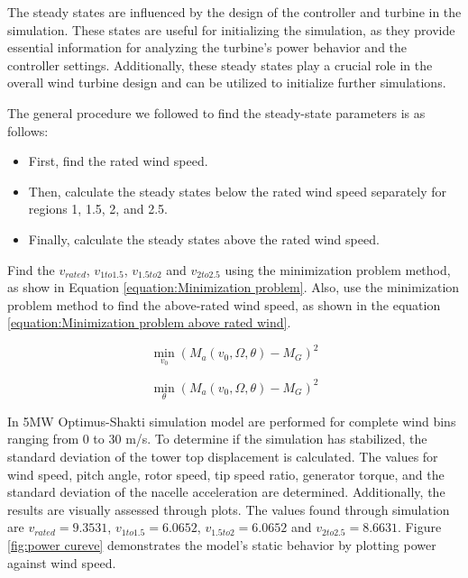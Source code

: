 
The steady states are influenced by the design of the controller and turbine in the simulation. These states are useful for initializing the simulation, as they provide essential information for analyzing the turbine's power behavior and the controller settings. Additionally, these steady states play a crucial role in the overall wind turbine design and can be utilized to initialize further simulations.

The general procedure we followed to find the steady-state parameters is as follows: 
\begin{itemize}
	\item First, find the rated wind speed. 
	\item Then, calculate the steady states below the rated wind speed separately for regions 1, 1.5, 2, and 2.5. 
	\item Finally, calculate the steady states above the rated wind speed.
\end{itemize}

Find the $v_{rated}$, $v_{1to1.5}$, $v_{1.5to2}$ and $v_{2to2.5}$ using the minimization problem method, as show in Equation \ref{equation:Minimization problem}. Also, use the minimization problem method to find the above-rated wind speed, as shown in the equation  \ref{equation:Minimization problem above rated wind}.

\begin{equation}
	\min_{v_0} \left( M_a(v_0, \Omega, \theta) - M_G \right)^2
	\label{equation:Minimization problem}
\end{equation}

\begin{equation}
	\min_{\theta} \left( M_a(v_0, \Omega, \theta) - M_G \right)^2
	\label{equation:Minimization problem above rated wind}
\end{equation}

In 5MW Optimus-Shakti simulation model are performed for complete wind bins ranging from 0 to 30 m/s. To determine if the simulation has stabilized, the standard deviation of the tower top displacement is calculated. The values for wind speed, pitch angle, rotor speed, tip speed ratio, generator torque, and the standard deviation of the nacelle acceleration are determined. Additionally, the results are visually assessed through plots. The values found through simulation are $v_{rated} = 9.3531$, $v_{1to1.5} = 6.0652$, $v_{1.5to2} = 6.0652$ and $v_{2to2.5} = 8.6631$. Figure \ref{fig:power cureve} demonstrates the model's static behavior by plotting power against wind speed.

